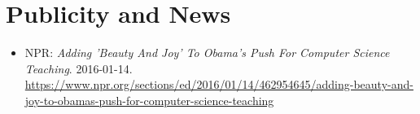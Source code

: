 \section{Publicity and News}

\vspace{6pt}

\begin{itemize}

  \setlength\itemsep{1em}

    \item{NPR: \textit{Adding 'Beauty And Joy' To Obama's Push For Computer Science Teaching}. 2016-01-14.}
    \newline
    \small{\href{https://www.npr.org/sections/ed/2016/01/14/462954645/adding-beauty-and-joy-to-obamas-push-for-computer-science-teaching}{https://www.npr.org/sections/ed/2016/01/14/462954645/adding-beauty-and-joy-to-obamas-push-for-computer-science-teaching}}

\end{itemize}

\vspace{2pt}